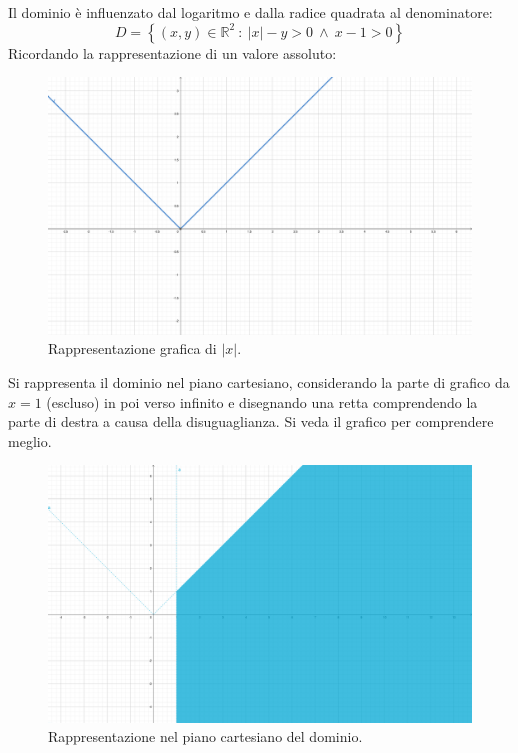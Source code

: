\documentclass[a4paper]{article}
\begin{document}
	\noindent
	Il dominio è influenzato dal logaritmo e dalla radice quadrata al denominatore:
	\begin{equation*}
		D = \left\{\left(x,y\right) \in \mathbb{R}^{2} \: : \: \left|x\right|-y > 0 \: \land \: x-1 > 0\right\}
	\end{equation*}
	Ricordando la rappresentazione di un valore assoluto:
	\begin{figure}[!htp]
		\centering
		\includegraphics[width=\textwidth]{img/valore-assoluto.pdf}
		\caption{Rappresentazione grafica di $\left|x\right|$.}
	\end{figure}

	\noindent
	Si rappresenta il dominio nel piano cartesiano, considerando la parte di grafico da $x = 1$ (escluso) in poi verso infinito e disegnando una retta comprendendo la parte di destra a causa della disuguaglianza. Si veda il grafico per comprendere meglio.\newpage

	\begin{figure}[!htp]
		\centering
		\includegraphics[width=.9\textwidth]{img/exercise/2023-06-21-A-ex3(a).pdf}
		\caption*{Rappresentazione nel piano cartesiano del dominio.}
	\end{figure}
\end{document}
